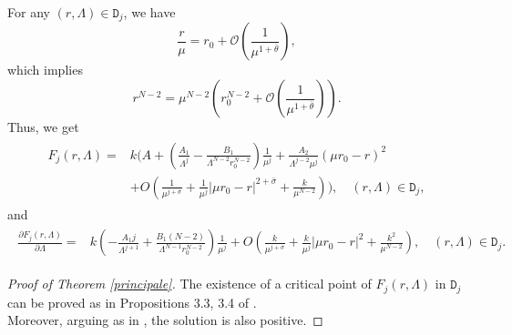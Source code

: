 \documentclass[11pt,a4paper]{amsart}
\begin{document}
For any $(r, \Lambda) \in \mathtt D_j$, we have
\[
\frac{r}{\mu}=r_{0}+\mathcal O\left(\frac{1}{\mu^{1+\bar\theta}}\right),
\]
which implies $$r^{N-2}=\mu^{N-2}\left(r_0^{N-2}+\mathcal O\left(\frac{1}{\mu^{1+\bar\theta}}\right)\right).$$
Thus, we get
\begin{align}\label{eq.nearly_finished_energy_estimate}
  \begin{aligned}
    F_j(r, \Lambda)=& k\Bigg(A+\left(\frac{A_{1}}{\Lambda^{j}}-\frac{B_{1}}{\Lambda^{N-2} r_{0}^{N-2}}\right) \frac{1}{\mu^{j}}+\frac{A_{2}}{\Lambda^{j-2} \mu^{j}}\left(\mu r_{0}-r\right)^{2} \\
& +O\left(\frac{1}{\mu^{j+\sigma}}+\frac{1}{\mu^{j}}\left|\mu r_{0}-r\right|^{2+\bar\sigma}+\frac{k}{\mu^{N-2}}\right)\Bigg), \quad(r, \Lambda) \in \mathtt D_j ,
  \end{aligned}
\end{align}
and
\begin{align}\label{eq.nearly_finished_partial_energy_estimate}
\begin{aligned}
  \frac{\partial F_j(r, \Lambda)}{\partial \Lambda}= & k\left(-\frac{A_{1} j}{\Lambda^{j+1}}+\frac{B_{1}(N-2)}{\Lambda^{N-1} r_{0}^{N-2}}\right) \frac{1}{\mu^{j}}  +O\left(\frac{k}{\mu^{j+\sigma}}+\frac{k}{\mu^{j}}\left|\mu r_{0}-r\right|^{2}+\frac{k^2}{\mu^{N-2}}\right),\quad(r, \Lambda) \in \mathtt D_j.
\end{aligned}
\end{align}
\begin{proof}[Proof of Theorem \ref{principale}]
The existence of a critical point of $F_j(r, \Lambda)$ in $\mathtt D_j$ can be proved as in Propositions 3.3, 3.4 of \cite{WeiYan_2010a}.\\  Moreover, arguing as in \cite{WangZhao_2013}, the solution is also positive.\end{proof}
\end{document}
